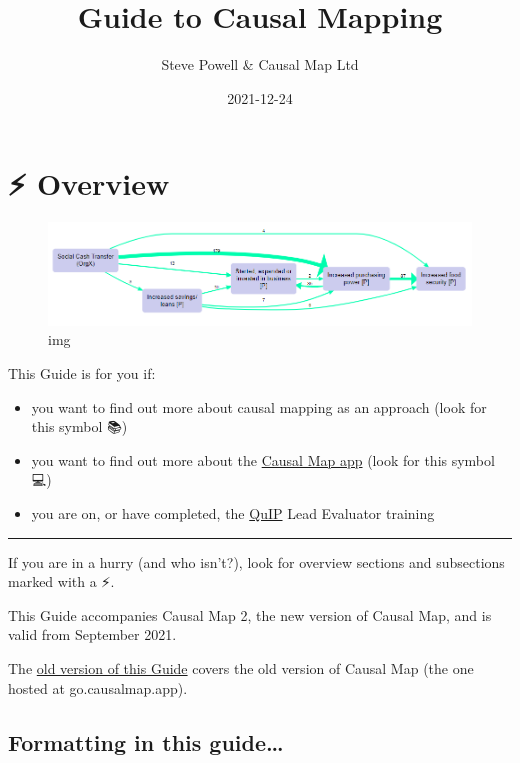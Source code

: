 \documentclass[
]{book}
\title{Guide to Causal Mapping}
\author{Steve Powell \& Causal Map Ltd}
\date{2021-12-24}
\providecommand{\tightlist}{%
  \setlength{\itemsep}{0pt}\setlength{\parskip}{0pt}}
\begin{document}
\maketitle

{
\setcounter{tocdepth}{1}
\tableofcontents
}
\hypertarget{overview}{%
\chapter{⚡ Overview}\label{overview}}

\begin{figure}
\centering
\includegraphics[width=6.77083in,height=\textheight]{_assets/simplify.png}
\caption{img}
\end{figure}

This Guide is for you if:

\begin{itemize}
\tightlist
\item
  you want to find out more about causal mapping as an approach (look for this symbol 📚)
\item
  you want to find out more about the \href{https://causalmap.app/}{Causal Map app} (look for this symbol 💻)
\item
  you are on, or have completed, the \href{https://bathsdr.org/about-the-quip/}{QuIP} Lead Evaluator training
\end{itemize}

\begin{center}\rule{0.5\linewidth}{0.5pt}\end{center}

If you are in a hurry (and who isn't?), look for overview sections and subsections marked with a ⚡.

This Guide accompanies Causal Map 2, the new version of Causal Map, and is valid from September 2021.

The \href{http://guide2.causalmap.app.s3-website.eu-west-2.amazonaws.com/}{old version of this Guide} covers the old version of Causal Map (the one hosted at go.causalmap.app).

\hypertarget{formatting-in-this-guide}{%
\section{Formatting in this guide\ldots{}}\label{formatting-in-this-guide}}
\end{document}
